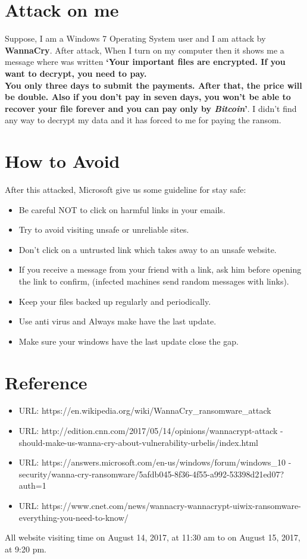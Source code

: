 \documentclass[a4paper,10pt]{article}
\begin{document}
\section{Attack on me}
Suppose, I am a Windows 7 Operating System user and I am attack by \textbf{WannaCry}. After attack, When I turn on my computer then it shows me 
a message where was written \textbf{`Your important files are encrypted. If you want to decrypt, you need to pay. \\You only three days
to submit the payments. After that, the price will be double. Also if you don't pay in seven days, you won't be able to recover your file 
forever and you can pay only by \textit{Bitcoin}'}. I didn't find any way to decrypt my data and it has forced to me for paying the ransom.
\section{How to Avoid}
           
           After this attacked, Microsoft give us some guideline for stay safe:
           \begin{itemize}
            \item Be careful NOT to click on harmful links in your emails. 
            \item Try to avoid visiting unsafe or unreliable sites.
            \item Don't click on a untrusted link which takes away to an unsafe website. 
            \item If you receive a message from your friend with a link, ask him before 
            opening the link to confirm, (infected machines send random messages with links).
            \item Keep your files backed up regularly and periodically.
            \item Use anti virus and Always make have the last update.
            \item Make sure your windows have the last update close the gap.
           \end{itemize}


\section{Reference}
\begin{itemize}
 \item URL: https://en.wikipedia.org/wiki/WannaCry\_ransomware\_attack
 \item URL: http://edition.cnn.com/2017/05/14/opinions/wannacrypt-attack
 -should-make-us-wanna-cry-about-vulnerability-urbelis/index.html
 \item URL: https://answers.microsoft.com/en-us/windows/forum/windows\_10
 -security/wanna-cry-ransomware/5afdb045-8f36-4f55-a992-53398d21ed07?auth=1
 \item URL: https://www.cnet.com/news/wannacry-wannacrypt-uiwix-ransomware-everything-you-need-to-know/
\end{itemize}

All website visiting time on August 14, 2017, at 11:30 am to on August 15, 2017, at 9:20 pm. 
\end{document}
